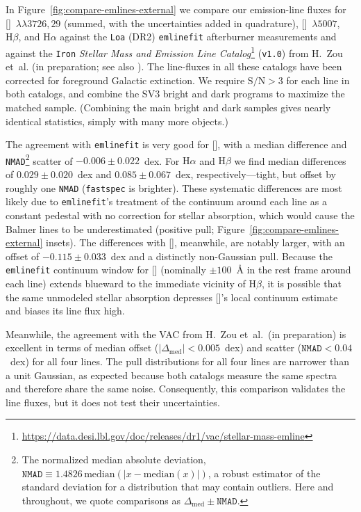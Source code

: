 \documentclass[modern,linenumbers]{aastex702}
\newcommand{\fastspec}{\texttt{fastspec}}
\newcommand{\oii}{[\ion{O}{2}]}
\newcommand{\oiii}{[\ion{O}{3}]}
\newcommand{\ha}{\ensuremath{\mathrm{H}\alpha}}
\newcommand{\hb}{\ensuremath{\mathrm{H}\beta}}
\newcommand{\oiiilam}{[\ion{O}{3}]~$\lambda5007$}
\newcommand{\oiidoublet}{[\ion{O}{2}]~$\lambda\lambda3726,29$}
\begin{document}
In Figure~\ref{fig:compare-emlines-external} we compare our
emission-line fluxes for \oiidoublet{} (summed, with the uncertainties
added in quadrature), \oiiilam, \hb, and \ha{} against the
\texttt{Loa} (DR2) \texttt{emlinefit} afterburner measurements
\citep{raichoor23a} and against the \texttt{Iron} \citep[DESI
  DR1;][]{desi-collaboration26a} \textit{Stellar Mass and Emission
  Line
  Catalog}\footnote{\url{https://data.desi.lbl.gov/doc/releases/dr1/vac/stellar-mass-emline}}
(\texttt{v1.0}) from H.~Zou et~al. (in preparation; see also
\citealt{zou24b, sui26a}). The line-fluxes in all
these catalogs have been corrected for foreground Galactic
extinction. We require $\mathrm{S/N}>3$ for each line in both
catalogs, and combine the SV3 bright and dark programs to maximize the
matched sample. (Combining the main bright and dark samples gives
nearly identical statistics, simply with many more objects.)

The agreement with \texttt{emlinefit} is very good for \oii, with a
median difference and \texttt{NMAD}\footnote{The normalized median
absolute deviation,
$\mathtt{NMAD}\equiv1.4826\,\mathrm{median}(|x-\mathrm{median}(x)|)$,
a robust estimator of the standard deviation for a distribution that
may contain outliers. Here and throughout, we quote comparisons as
$\Delta_\mathrm{med}\pm\mathtt{NMAD}$.} scatter of
$-0.006\pm0.022$~dex. For \ha{} and \hb{} we find median differences of
$0.029\pm0.020$~dex and $0.085\pm0.067$~dex, respectively---tight,
but offset by roughly one \texttt{NMAD} (\fastspec{} is
brighter). These systematic differences are most likely due to
\texttt{emlinefit}'s treatment of the continuum around each line as a
constant pedestal with no correction for stellar absorption, which
would cause the Balmer lines to be underestimated (positive pull;
Figure~\ref{fig:compare-emlines-external} insets). The differences
with \oiii, meanwhile, are notably larger, with an offset of
$-0.115\pm0.033$~dex and a distinctly non-Gaussian pull. Because the
\texttt{emlinefit} continuum window for \oiii{} (nominally
$\pm100$~\AA{} in the rest frame around each line) extends blueward to
the immediate vicinity of \hb, it is possible that the same unmodeled
stellar absorption depresses \oiii{}'s local continuum estimate and
biases its line flux high.

Meanwhile, the agreement with the VAC from H.~Zou et~al.\ (in
preparation) is excellent in terms of median offset
($|\Delta_\textrm{med}|<0.005$~dex) and scatter
($\mathtt{NMAD}<0.04$~dex) for all four lines. The pull distributions for all four
lines are narrower than a unit Gaussian, as expected because both
catalogs measure the same spectra and therefore share the same
noise. Consequently, this comparison validates the line fluxes, but it
does not test their uncertainties.
\end{document}
